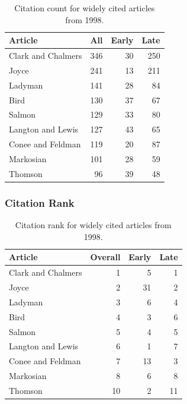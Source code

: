 \documentclass[
  10pt,
  letterpaper,
  DIV=11,
  numbers=noendperiod,
  twoside]{scrartcl}
\begin{document}
\begin{longtable}[]{@{}lrrr@{}}

\caption{\label{tbl-citation-count-1998}Citation count for widely cited
articles from 1998.}

\tabularnewline

\toprule\noalign{}
Article & All & Early & Late \\
\midrule\noalign{}
\endhead
\bottomrule\noalign{}
\endlastfoot
Clark and Chalmers & 346 & 30 & 250 \\
Joyce & 241 & 13 & 211 \\
Ladyman & 141 & 28 & 84 \\
Bird & 130 & 37 & 67 \\
Salmon & 129 & 33 & 80 \\
Langton and Lewis & 127 & 43 & 65 \\
Conee and Feldman & 119 & 20 & 87 \\
Markosian & 101 & 28 & 59 \\
Thomson & 96 & 39 & 48 \\

\end{longtable}

\subsubsection*{Citation Rank}\label{citation-rank-22}

\begin{longtable}[]{@{}lrrr@{}}

\caption{\label{tbl-citation-rank-1998}Citation rank for widely cited
articles from 1998.}

\tabularnewline

\toprule\noalign{}
Article & Overall & Early & Late \\
\midrule\noalign{}
\endhead
\bottomrule\noalign{}
\endlastfoot
Clark and Chalmers & 1 & 5 & 1 \\
Joyce & 2 & 31 & 2 \\
Ladyman & 3 & 6 & 4 \\
Bird & 4 & 3 & 6 \\
Salmon & 5 & 4 & 5 \\
Langton and Lewis & 6 & 1 & 7 \\
Conee and Feldman & 7 & 13 & 3 \\
Markosian & 8 & 6 & 8 \\
Thomson & 10 & 2 & 11 \\

\end{longtable}
\end{document}
